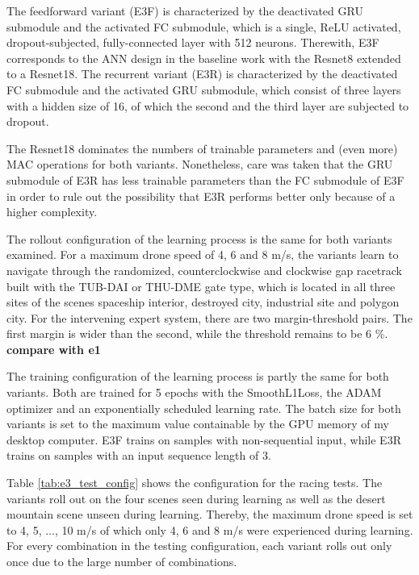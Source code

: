The feedforward variant (E3F)
is characterized by the deactivated GRU submodule
and the activated FC submodule,
which is a single, ReLU activated,
dropout-subjected, fully-connected layer with 512 neurons.
Therewith, 
E3F corresponds to the ANN design in the baseline work
with the Resnet8 extended to a Resnet18.
The recurrent variant (E3R)
is characterized by the deactivated FC submodule
and the activated GRU submodule,
which consist of three layers with a hidden size of 16, of
which the second and the third layer are subjected to dropout.

The Resnet18 dominates the numbers of trainable parameters
and (even more) MAC operations for both variants.
Nonetheless, care was taken that the
GRU submodule of E3R
has less trainable parameters
than the FC submodule of E3F
in order to rule out
the possibility that E3R performs 
better only because of a higher complexity.

The rollout configuration of the learning process 
is the same for both variants examined.
For a maximum drone speed of 
4, 6 and 8 m/s,
the variants learn to navigate 
through the randomized, counterclockwise 
and clockwise gap racetrack 
built with the TUB-DAI or THU-DME gate type,
which is located in all three sites of the scenes
spaceship interior, destroyed city,
industrial site and polygon city.
For the intervening expert system,
there are two margin-threshold pairs.
The first margin is wider than the second,
while the threshold remains to be 6 \%.
\textbf{compare with e1}


The training configuration of the learning process 
is partly the same for both variants.
Both are trained for 5 epochs 
with the SmoothL1Loss, the ADAM optimizer
and an exponentially scheduled learning rate.
The batch size for both variants 
is set to the maximum value containable by the GPU
memory of my desktop computer.
E3F trains on samples with non-sequential input,
while E3R trains on samples with an input sequence length
of 3.

Table \ref{tab:e3_test_config} shows the configuration for the racing tests.
The variants roll out on the four scenes seen during learning
as well as the desert mountain scene unseen during learning.
Thereby, the maximum drone speed is set to 
4, 5, ..., 10 m/s  of which only 4, 6 and 8 m/s
were experienced during learning.
For every combination in the testing configuration,
each variant rolls out only once
due to the large number of combinations.

